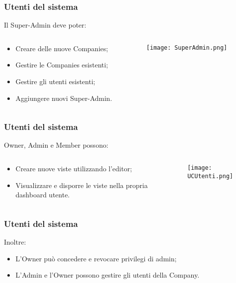 \begin{frame}
  \frametitle{Utenti del sistema}
  Il Super-Admin deve poter:
  \begin{columns}
    \begin{column}{0.5\textwidth}   
    \begin{itemize}
    \item Creare delle nuove Companies;
    \item Gestire le Companies esistenti;
    \item Gestire gli utenti esistenti;
    \item Aggiungere nuovi Super-Admin.
    \end{itemize}
    \end{column}
    \begin{column}{0.5\textwidth}
    \texttt{[image: SuperAdmin.png]}
    \end{column}
  \end{columns}
\end{frame}

\begin{frame}
  \frametitle{Utenti del sistema}
  Owner, Admin e Member possono:
  \begin{columns}
    \begin{column}{0.5\textwidth}
       \begin{itemize}
       \item Creare nuove viste utilizzando l'editor;
       \item Visualizzare e disporre le viste nella propria dashboard utente.
       \end{itemize}
    \end{column}
    \begin{column}{0.5\textwidth}
    \texttt{[image: UCUtenti.png]}
    \end{column}
  \end{columns}
\end{frame}

\begin{frame}
  \frametitle{Utenti del sistema}
  Inoltre:
  \begin{itemize}
  \item L'Owner può concedere e revocare privilegi di admin;
  \item L'Admin e l'Owner possono gestire gli utenti della Company.
  \end{itemize}

\end{frame}


